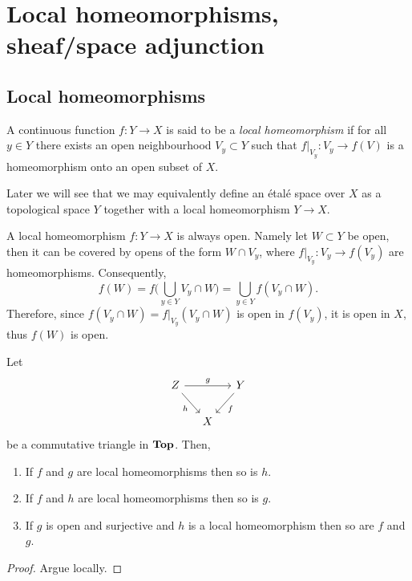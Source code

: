 \documentclass[../main.tex]{subfiles}
\begin{document}

\chapter{Local homeomorphisms, sheaf/space adjunction}

\section{Local homeomorphisms}
\noindent

\begin{defn}
    A continuous function $f\colon Y\to X$ is said to be a \emph{local homeomorphism} if for all $y\in Y$ there exists an open neighbourhood $V_y\subset Y$ such that $f|_{V_y}\colon V_y\to f(V)$ is a homeomorphism onto an open subset of $X$. 
\end{defn}

Later we will see that we may equivalently define an étalé space over $X$ as a topological space $Y$ together with a local homeomorphism $Y\to X$. 
\begin{rmk}
    A local homeomorphism $f\colon Y\to X$ is always open. Namely let $W\subset Y$ be open, then it can be covered by opens of the form $W\cap V_y$, where $f|_{V_y}\colon V_y \to f(V_y)$ are homeomorphisms. Consequently,
\[f(W) = f\bigl(\bigcup_{y\in Y} V_y\cap W \bigr) = \bigcup_{y\in Y} f(V_y\cap W)\text{.}\] Therefore, since $f(V_y\cap W) = f|_{V_y}(V_y\cap W)$ is open in $f(V_y)$, it is open in $X$, thus $f(W)$ is open.
\end{rmk}

\begin{lem}\label{lem:localhomtriangle}
    Let
    \[\begin{tikzcd}[column sep=small]
    Z \arrow[rr, "g"] \arrow[rd, "h"'] &   & Y \arrow[ld, "f"] \\
                                       & X &                  
    \end{tikzcd}\]
    be a commutative triangle in $\mathbf{Top}$. Then,
    \begin{enumerate}
        \item\label{lem:localhomtriangle:f-g} If $f$ and $g$ are local homeomorphisms then so is $h$.
        \item\label{lem:localhomtriangle:f-h} If $f$ and $h$ are local homeomorphisms then so is $g$.
        \item\label{lem:localhomtriangle:g-open-surj-h} If $g$ is open and surjective and $h$ is a local homeomorphism then so are $f$ and $g$.
    \end{enumerate}
\end{lem}
\begin{proof}
    Argue locally. 
\end{proof}
\end{document}

